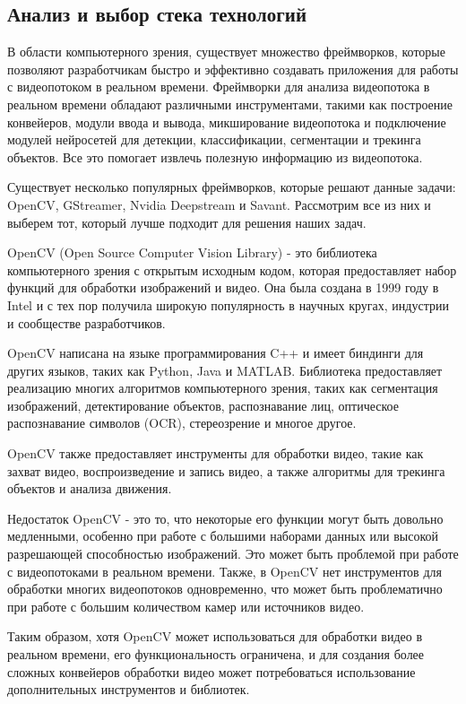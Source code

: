 \subsection{Анализ и выбор стека технологий}
В области компьютерного зрения, существует множество фреймворков, которые позволяют разработчикам быстро и эффективно создавать приложения для работы с видеопотоком в реальном времени. Фреймворки для анализа видеопотока в реальном времени обладают различными инструментами, такими как построение конвейеров, модули ввода и вывода, микширование видеопотока и подключение модулей нейросетей для детекции, классификации, сегментации и трекинга объектов. Все это помогает извлечь полезную информацию из видеопотока. 

Существует несколько популярных фреймворков, которые решают данные задачи: OpenCV, GStreamer\cite{Gstreamer}, Nvidia Deepstream \cite{Deepstream} и Savant. Рассмотрим все из них и выберем тот, который лучше подходит для решения наших задач.

OpenCV (Open Source Computer Vision Library) - это библиотека компьютерного зрения с открытым исходным кодом, которая предоставляет набор функций для обработки изображений и видео. Она была создана в 1999 году в Intel и с тех пор получила широкую популярность в научных кругах, индустрии и сообществе разработчиков.

OpenCV написана на языке программирования C++ и имеет биндинги для других языков, таких как Python, Java и MATLAB. Библиотека предоставляет реализацию многих алгоритмов компьютерного зрения, таких как сегментация изображений, детектирование объектов, распознавание лиц, оптическое распознавание символов (OCR), стереозрение и многое другое.

OpenCV также предоставляет инструменты для обработки видео, такие как захват видео, воспроизведение и запись видео, а также алгоритмы для трекинга объектов и анализа движения.

Недостаток OpenCV - это то, что некоторые его функции могут быть довольно медленными, особенно при работе с большими наборами данных или высокой разрешающей способностью изображений. Это может быть проблемой при работе с видеопотоками в реальном времени. Также, в OpenCV нет инструментов для обработки многих видеопотоков одновременно, что может быть проблематично при работе с большим количеством камер или источников видео. 

Таким образом, хотя OpenCV может использоваться для обработки видео в реальном времени, его функциональность ограничена, и для создания более сложных конвейеров обработки видео может потребоваться использование дополнительных инструментов и библиотек.


